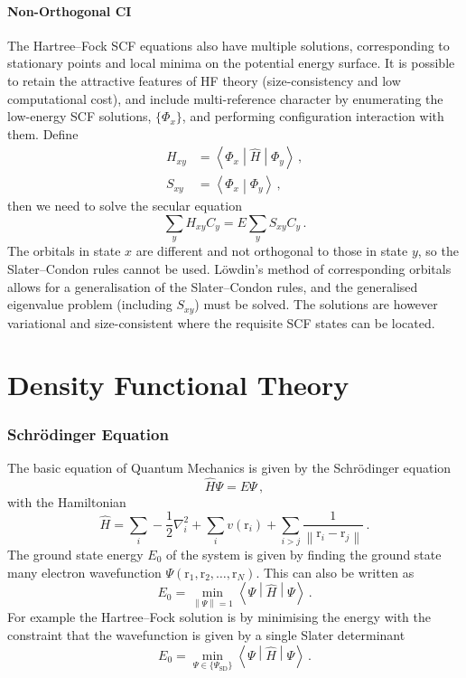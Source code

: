 \documentclass{article}
\theoremstyle{plain}\theoremheaderfont{\normalfont\itshape}\theorembodyfont{\rmfamily}\theoremseparator{.}\newtheorem*{rem}{Remark}\newtheorem*{ex}{Example}\newtheorem*{proof}{Proof}\newtheorem*{altp}{Alternative proof}
\theoremstyle{plain}\theoremheaderfont{\normalfont\bfseries}\theorembodyfont{\rmfamily}\theoremseparator{.}\newtheorem{thm}{Theorem}[section]\newtheorem{lem}[thm]{Lemma}\newtheorem{prop}[thm]{Proposition}\newtheorem*{cor}{Corollary}\newtheorem{defn}[thm]{Definition}\newtheorem{clm}[thm]{Claim}\newtheorem{clminproof}{Claim}
\theoremstyle{break}\theoremheaderfont{\normalfont\itshape}\theorembodyfont{\rmfamily}\theoremseparator{.\medskip}\newtheorem*{proofskip}{Proof}\newtheorem*{exs}{Examples}\newtheorem*{rems}{Remarks}
\theoremstyle{break}\theoremheaderfont{\normalfont\bfseries}\theorembodyfont{\rmfamily}\theoremseparator{.\medskip}\newtheorem{lemskip}[thm]{Lemma}\newtheorem{defnskip}[thm]{Definition}\newtheorem{propskip}[thm]{Proposition}\newtheorem{thmskip}[thm]{Theorem}
\numberwithin{equation}{section}
\newcommand{\braket}[2]{\left\langle #1 \middle| #2 \right\rangle}
\newcommand{\mel}[3]{\left\langle #1 \middle| #2 \middle| #3 \right\rangle}
\newcommand{\expval}[2]{\left\langle #2 \middle| #1 \middle| #2 \right\rangle}
\newcommand{\vb}[1]{\bm{\mathrm{#1}}}
\newcommand{\norm}[1]{\left\| #1 \right\|}
\newcommand{\laplacian}{\nabla^2}
\begin{document}
    \subsection{Non-Orthogonal CI}
    The Hartree--Fock SCF equations also have multiple solutions, corresponding to stationary points and local minima on the potential energy surface. It is possible to retain the attractive features of HF theory (size-consistency and low computational cost), and include multi-reference character by enumerating the low-energy SCF solutions, \(\{\Phi_x\}\), and performing configuration interaction with them. Define
    \begin{align}
        H_{xy}&=\mel{\Phi_x}{\hat{H}}{\Phi_y}\,,\\
        S_{xy}&=\braket{\Phi_x}{\Phi_y}\,,
    \end{align}
    then we need to solve the secular equation
    \begin{equation}
        \sum_{y}H_{xy}C_y=E\sum_{y}S_{xy}C_y\,.
    \end{equation}
    The orbitals in state \(x\) are different and not orthogonal to those in state \(y\), so the Slater--Condon rules cannot be used. L\"{o}wdin's method of corresponding orbitals allows for a generalisation of the Slater--Condon rules, and the generalised eigenvalue problem (including \(S_{xy}\)) must be solved. The solutions are however variational and size-consistent where the requisite SCF states can be located.

    \newpage
    \part{Density Functional Theory}
    \section{Schr\"{o}dinger Equation}
    The basic equation of Quantum Mechanics is given by the Schr\"{o}dinger equation
    \begin{equation}
        \hat{H}\Psi=E\Psi\,,
    \end{equation}
    with the Hamiltonian
    \begin{equation}
        \hat{H}=\sum_i-\frac{1}{2}\laplacian_i +\sum_i v(\vb{r}_i)+\sum_{i>j}\frac{1}{\norm{\vb{r}_i-\vb{r}_j}}\,.
    \end{equation}
    The ground state energy \(E_0\) of the system is given by finding the ground state many electron wavefunction \(\Psi(\vb{r}_1,\vb{r}_2,\dots,\vb{r}_N)\). This can also be written as
    \begin{equation}
        E_0=\min_{\norm{\Psi}=1}\expval{\hat{H}}{\Psi}\,.
    \end{equation}
    For example the Hartree--Fock solution is by minimising the energy with the constraint that the wavefunction is given by a single Slater determinant
    \begin{equation}
        E_0=\min_{\Psi\in\{\Psi_{\text{SD}}\}}\expval{\hat{H}}{\Psi}\,.
    \end{equation}
    
\end{document}
